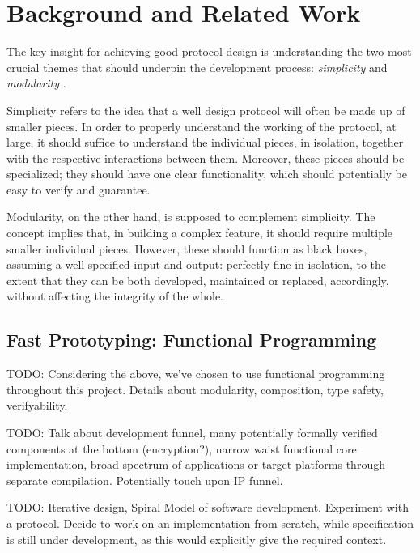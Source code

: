 \chapter{Background and Related Work}
The key insight for achieving good protocol design is understanding the two most crucial themes that should underpin the development process: \textit{simplicity} and \textit{modularity} \cite{ProtocolDesign}.

Simplicity refers to the idea that a well design protocol will often be made up of smaller pieces. In order to properly understand the working of the protocol, at large, it should suffice to understand the individual pieces, in isolation, together with the respective interactions between them. Moreover, these pieces should be specialized; they should have one clear functionality, which should potentially be easy to verify and guarantee.

Modularity, on the other hand, is supposed to complement simplicity. The concept implies that, in building a complex feature, it should require multiple smaller individual pieces. However, these should function as black boxes, assuming a well specified input and output: perfectly fine in isolation, to the extent that they can be both developed, maintained or replaced, accordingly, without affecting the integrity of the whole.

\section{Fast Prototyping: Functional Programming}
TODO: Considering the above, we've chosen to use functional programming throughout this project. Details about modularity, composition, type safety, verifyability.

TODO: Talk about development funnel, many potentially formally verified components at the bottom (encryption?), narrow waist functional core implementation, broad spectrum of applications or target platforms through separate compilation. Potentially touch upon IP funnel.

TODO: Iterative design, Spiral Model of software development. Experiment with a \wip protocol. Decide to work on an implementation from scratch, while specification is still under development, as this would explicitly give the required context.

